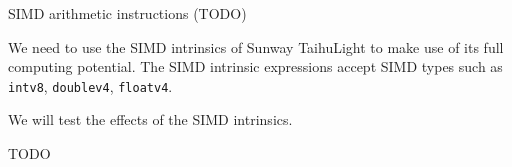 SIMD arithmetic instructions (TODO)

We need to use the SIMD intrinsics of Sunway TaihuLight to make use of its full computing potential.
The SIMD intrinsic expressions accept SIMD types such as
\verb`intv8`,
\verb`doublev4`,
\verb`floatv4`.


We will test the effects of the SIMD intrinsics.


TODO

